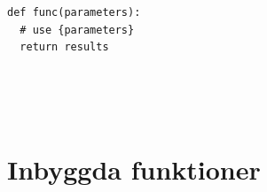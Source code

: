 \begin{frame}[fragile]
    \begin{verbatim}
def func(parameters):
  # use {parameters}
  return results
  \end{verbatim}
\end{frame}

\begin{frame}[fragile]
  \begin{example}[summera.py]
    \inputminted{python}{examples/summera.py}
  \end{example}
\end{frame}

\begin{frame}[fragile]
  \begin{example}
    \inputminted{python}{examples/input-int.py}
  \end{example}
\end{frame}

\begin{frame}[fragile]
  \begin{example}
    \inputminted{python}{examples/input-int-default.py}
  \end{example}
\end{frame}

\begin{frame}[fragile]
  \begin{example}
    \inputminted[firstline=3,lastline=12]{python}{examples/input-type.py}
  \end{example}
\end{frame}

\begin{frame}[fragile]
  \begin{example}
    \inputminted[firstline=14]{python}{examples/input-type.py}
  \end{example}
\end{frame}


\section{Inbyggda funktioner}

